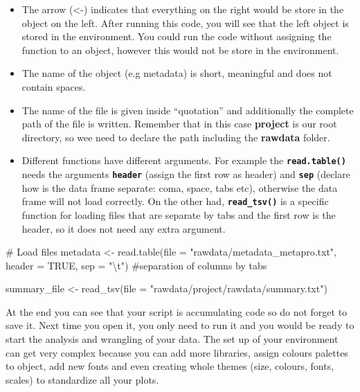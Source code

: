 \documentclass[
  letterpaper,
  DIV=11,
  numbers=noendperiod]{scrartcl}
\newenvironment{Shaded}{\begin{snugshade}}{\end{snugshade}}
\newcommand{\AttributeTok}[1]{\textcolor[rgb]{0.40,0.45,0.13}{#1}}
\newcommand{\CommentTok}[1]{\textcolor[rgb]{0.37,0.37,0.37}{#1}}
\newcommand{\ConstantTok}[1]{\textcolor[rgb]{0.56,0.35,0.01}{#1}}
\newcommand{\FunctionTok}[1]{\textcolor[rgb]{0.28,0.35,0.67}{#1}}
\newcommand{\NormalTok}[1]{\textcolor[rgb]{0.00,0.23,0.31}{#1}}
\newcommand{\OtherTok}[1]{\textcolor[rgb]{0.00,0.23,0.31}{#1}}
\newcommand{\SpecialCharTok}[1]{\textcolor[rgb]{0.37,0.37,0.37}{#1}}
\newcommand{\StringTok}[1]{\textcolor[rgb]{0.13,0.47,0.30}{#1}}
\begin{document}
\begin{itemize}
\item
  The arrow (\textless-) indicates that everything on the right would be
  store in the object on the left. After running this code, you will see
  that the left object is stored in the environment. You could run the
  code without assigning the function to an object, however this would
  not be store in the environment.
\item
  The name of the object (e.g metadata) is short, meaningful and does
  not contain spaces.
\item
  The name of the file is given inside ``quotation'' and additionally
  the complete path of the file is written. Remember that in this case
  \textbf{project} is our root directory, so wee need to declare the
  path including the \textbf{rawdata} folder.
\item
  Different functions have different arguments. For example the
  \textbf{\texttt{read.table()}} needs the arguments
  \textbf{\texttt{header}} (assign the first row as header) and
  \textbf{\texttt{sep}} (declare how is the data frame separate: coma,
  space, tabs etc), otherwise the data frame will not load correctly. On
  the other had, \textbf{\texttt{read\_tsv()}} is a specific function
  for loading files that are separate by tabs and the first row is the
  header, so it does not need any extra argument.
\end{itemize}

\begin{Shaded}
\begin{Highlighting}[]
\CommentTok{\# Load files}
\NormalTok{metadata }\OtherTok{\textless{}{-}} \FunctionTok{read.table}\NormalTok{(}\AttributeTok{file =} \StringTok{"rawdata/metadata\_metapro.txt"}\NormalTok{,}
                       \AttributeTok{header =} \ConstantTok{TRUE}\NormalTok{,}
                       \AttributeTok{sep =} \StringTok{"}\SpecialCharTok{\textbackslash{}t}\StringTok{"}\NormalTok{) }\CommentTok{\#separation of columns by tabs}

\NormalTok{summary\_file }\OtherTok{\textless{}{-}} \FunctionTok{read\_tsv}\NormalTok{(}\AttributeTok{file =} \StringTok{"rawdata/project/rawdata/summary.txt"}\NormalTok{)}
\end{Highlighting}
\end{Shaded}

At the end you can see that your script is accumulating code so do not
forget to save it. Next time you open it, you only need to run it and
you would be ready to start the analysis and wrangling of your data. The
set up of your environment can get very complex because you can add more
libraries, assign colours palettes to object, add new fonts and even
creating whole themes (size, colours, fonts, scales) to standardize all
your plots.
\end{document}
